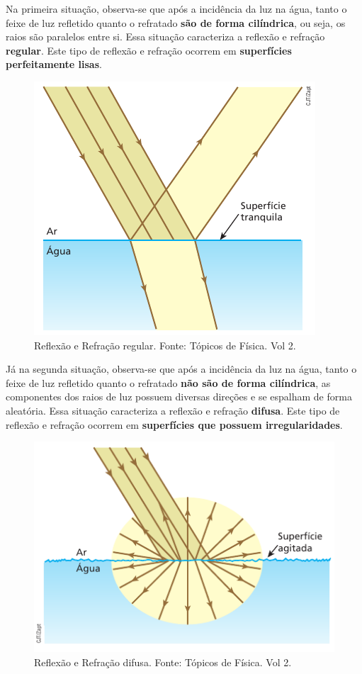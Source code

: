 \documentclass[11pt,twocolumn,oneside]{article}
\begin{document}
Na primeira situação, observa-se que após a incidência da luz na água, tanto o feixe de luz refletido quanto o refratado \textbf{são de forma cilíndrica}, ou seja, os raios são paralelos entre si. Essa situação caracteriza a reflexão e refração \textbf{regular}. Este tipo de reflexão e refração ocorrem em \textbf{superfícies perfeitamente lisas}.


\begin{figure}[h]{}
\centering\includegraphics[width=2.5truein]{img8.png}
\caption{Reflexão e Refração regular. Fonte: Tópicos de Física. Vol 2.}
\centering
\end{figure}

Já na segunda situação, observa-se que após a incidência da luz na água, tanto o feixe de luz refletido quanto o refratado \textbf{não são de forma cilíndrica}, as componentes dos raios de luz possuem diversas direções e se espalham de forma aleatória. Essa situação caracteriza a reflexão e refração \textbf{difusa}. Este tipo de reflexão e refração ocorrem em \textbf{superfícies que possuem irregularidades}.


\begin{figure}[h]{}
\centering\includegraphics[width=2.5truein]{img9.png}
\caption{Reflexão e Refração difusa. Fonte: Tópicos de Física. Vol 2.}
\centering
\end{figure}
\end{document}
